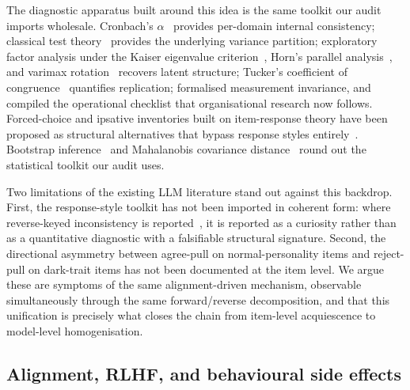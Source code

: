 \documentclass[11pt]{article}
\begin{document}
The diagnostic apparatus built around this idea is the same toolkit our audit imports wholesale. Cronbach's $\alpha$~\citep{cronbach1951coefficient} provides per-domain internal consistency; classical test theory~\citep{lord1968statistical} provides the underlying variance partition; exploratory factor analysis under the Kaiser eigenvalue criterion~\citep{kaiser1960application}, Horn's parallel analysis~\citep{horn1965parallel}, and varimax rotation~\citep{kaiser1958varimax} recovers latent structure; Tucker's coefficient of congruence~\citep{tucker1951method} quantifies replication; \citet{meredith1993measurement} formalised measurement invariance, and \citet{vandenberg2000review} compiled the operational checklist that organisational research now follows. Forced-choice and ipsative inventories built on item-response theory have been proposed as structural alternatives that bypass response styles entirely~\citep{brown2011forcedchoice,treaux2025forced}. Bootstrap inference~\citep{efron1979bootstrap} and Mahalanobis covariance distance~\citep{mahalanobis1936generalised} round out the statistical toolkit our audit uses.

Two limitations of the existing LLM literature stand out against this backdrop. First, the response-style toolkit has not been imported in coherent form: where reverse-keyed inconsistency is reported~\citep{acquiescence2025emnlp}, it is reported as a curiosity rather than as a quantitative diagnostic with a falsifiable structural signature. Second, the directional asymmetry between agree-pull on normal-personality items and reject-pull on dark-trait items has not been documented at the item level. We argue these are symptoms of the same alignment-driven mechanism, observable simultaneously through the same forward/reverse decomposition, and that this unification is precisely what closes the chain from item-level acquiescence to model-level homogenisation.

\subsection{Alignment, RLHF, and behavioural side effects}
\label{sec:related-alignment}
\end{document}
